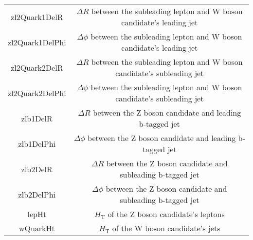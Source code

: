 \begin{table}[htbp]
{\begin{tabular}{cc}
    zl2Quark1DelR & $\Delta R$ between the subleading lepton and W boson candidate's leading jet \\
    zl2Quark1DelPhi & $\Delta \phi$ between the subleading lepton and W boson candidate's leading jet \\
    zl2Quark2DelR & $\Delta R$ between the subleading lepton and W boson candidate's subleading jet \\
    zl2Quark2DelPhi & $\Delta \phi$ between the subleading lepton and W boson candidate's subleading jet \\
    zlb1DelR & $\Delta R$ between the Z boson candidate and leading b-tagged jet \\
    zlb1DelPhi & $\Delta \phi$ between the Z boson candidate and leading b-tagged jet \\
    zlb2DelR & $\Delta R$ between the Z boson candidate and subleading b-tagged jet\\
    zlb2DelPhi & $\Delta \phi$ between the Z boson candidate and subleading b-tagged jet \\
    lepHt & ${\ensuremath{H_{\mathrm{T}}}}$ of the Z boson candidate's leptons \\
    wQuarkHt & ${\ensuremath{H_{\mathrm{T}}}}$ of the W boson candidate's jets \\
   \hline
 \end{tabular}}
\end{table}

